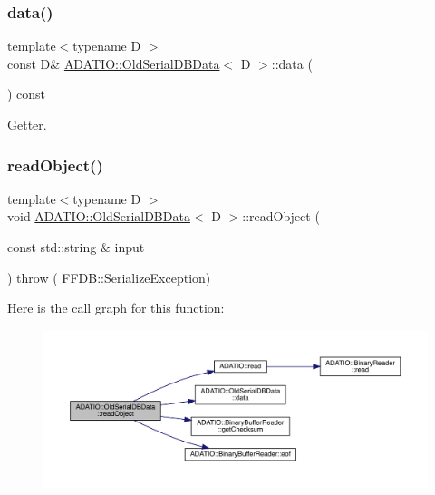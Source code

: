 \subsubsection{\texorpdfstring{data()}{data()}\hspace{0.1cm}{\footnotesize\ttfamily [6/6]}}
{\footnotesize\ttfamily template$<$typename D $>$ \\
const D\& \mbox{\hyperlink{classADATIO_1_1OldSerialDBData}{A\+D\+A\+T\+I\+O\+::\+Old\+Serial\+D\+B\+Data}}$<$ D $>$\+::data (\begin{DoxyParamCaption}{ }\end{DoxyParamCaption}) const\hspace{0.3cm}{\ttfamily [inline]}}



Getter. 

\mbox{\label{classADATIO_1_1OldSerialDBData_aad0338cd19224fe3eb6223afe7e2c2c4}} 
\subsubsection{\texorpdfstring{readObject()}{readObject()}\hspace{0.1cm}{\footnotesize\ttfamily [1/3]}}
{\footnotesize\ttfamily template$<$typename D $>$ \\
void \mbox{\hyperlink{classADATIO_1_1OldSerialDBData}{A\+D\+A\+T\+I\+O\+::\+Old\+Serial\+D\+B\+Data}}$<$ D $>$\+::read\+Object (\begin{DoxyParamCaption}\item[{const std\+::string \&}]{input }\end{DoxyParamCaption}) throw ( F\+F\+D\+B\+::\+Serialize\+Exception) \hspace{0.3cm}{\ttfamily [inline]}}

Here is the call graph for this function\+:
\nopagebreak
\begin{figure}[H]
\begin{center}
\leavevmode
\includegraphics[width=350pt]{da/dbc/classADATIO_1_1OldSerialDBData_aad0338cd19224fe3eb6223afe7e2c2c4_cgraph}
\end{center}
\end{figure}
\mbox{\label{classADATIO_1_1OldSerialDBData_aad0338cd19224fe3eb6223afe7e2c2c4}} 
